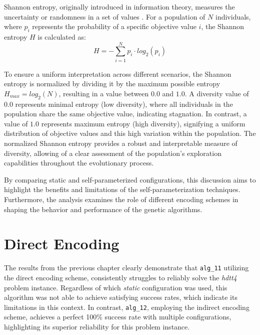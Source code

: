 \documentclass[english,examples]{isasthesis}
\begin{document}
Shannon entropy, originally introduced in information theory, measures the
uncertainty or randomness in a set of values \cite{shannon1948mathematical}.
For a population of $N$ individuals, where $p_i$ represents the probability of
a specific objective value $i$, the Shannon entropy $H$ is calculated as:
\begin{equation}
    H = - \sum_{i=1}^{N} p_i \cdot log_2(p_i)
\end{equation}

To ensure a uniform interpretation across different scenarios, the Shannon
entropy is normalized by dividing it by the maximum possible entropy
$H_{max} = log_2(N)$, resulting in a value between $0.0$ and $1.0$.
A diversity value of $0.0$ represents minimal entropy (low diversity), where
all individuals in the population share the same objective value, indicating
stagnation.
In contrast, a value of $1.0$ represents maximum entropy (high diversity),
signifying a uniform distribution of objective values and this high variation
within the population.
%
The normalized Shannon entropy provides a robust and interpretable measure of
diversity, allowing of a clear assessment of the population's exploration
capabilities throughout the evolutionary process.

By comparing static and self-parameterized configurations, this
discussion aims to highlight the benefits and limitations of the
self-parameterization techniques. Furthermore, the analysis examines the role
of different encoding schemes in shaping the behavior and performance of the
genetic algorithms.

\section{Direct Encoding}
The results from the previous chapter clearly demonstrate that \texttt{alg\_11}
utilizing the direct encoding scheme, consistently struggles to reliably solve
the \textit{hdtt4} problem instance.
Regardless of which \textit{static} configuration was used, this algorithm was
not able to achieve satisfying success rates, which indicate its limitations in
this context.
In contrast, \texttt{alg\_12}, employing the indirect encoding scheme, achieves
a perfect 100\% success rate with multiple configurations, highlighting its
superior reliability for this problem instance.
\end{document}
